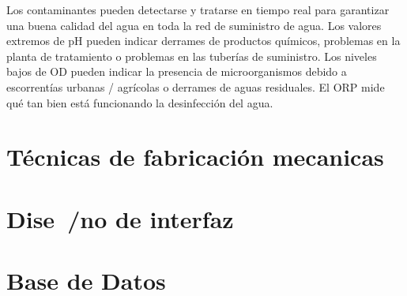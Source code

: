 Los contaminantes pueden detectarse y tratarse en tiempo real para garantizar una buena calidad del agua en toda la red de suministro de agua. 
Los valores extremos de pH pueden indicar derrames de productos químicos, problemas en la planta de tratamiento o problemas en las tuberías de suministro. 
Los niveles bajos de OD pueden indicar la presencia de microorganismos debido a escorrentías urbanas / agrícolas o derrames de aguas residuales. 
El ORP mide qué tan bien está funcionando la desinfección del agua.








\section{T\'ecnicas de fabricaci\'on mecanicas}

\section{Dise~/no de interfaz}

\section{Base de Datos}

